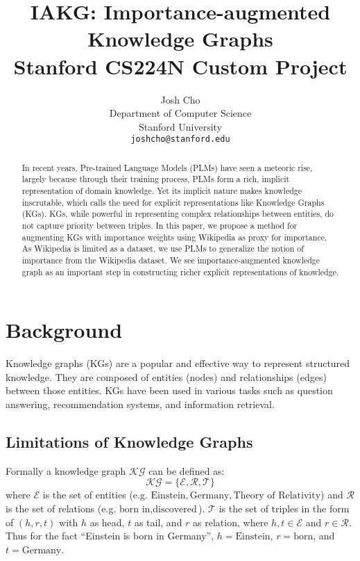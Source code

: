 \documentclass{article}
\title{
  IAKG: Importance-augmented Knowledge Graphs \\
  \vspace{1em}
  \small{\normalfont Stanford CS224N Custom Project}  %
}
\author{
  Josh Cho \\
  Department of Computer Science \\
  Stanford University \\
  \texttt{joshcho@stanford.edu} \\
}
\begin{document}
\maketitle

\begin{abstract}
  In recent years, Pre-trained Language Models (PLMs) have seen a meteoric rise, largely because through their training process, PLMs form a rich, implicit representation of domain knowledge. Yet its implicit nature makes knowledge inscrutable, which calls the need for explicit representations like Knowledge Graphs (KGs). KGs, while powerful in representing complex relationships between entities, do not capture priority between triples. In this paper, we propose a method for augmenting KGs with importance weights using Wikipedia as proxy for importance. As Wikipedia is limited as a dataset, we use PLMs to generalize the notion of importance from the Wikipedia dataset. We see importance-augmented knowledge graph as an important step in constructing richer explicit representations of knowledge.
\end{abstract}

\section{Background}
Knowledge graphs (KGs) are a popular and effective way to represent structured knowledge. They are composed of entities (nodes) and relationships (edges) between those entities. KGs have been used in various tasks such as question answering, recommendation systems, and information retrieval.

\subsection{Limitations of Knowledge Graphs}
Formally a knowledge graph $\mathcal{KG}$ can be defined as:
\begin{equation*}
  \mathcal{KG} = \{\mathcal{E}, \mathcal{R}, \mathcal{T}\}
\end{equation*}
where $\mathcal{E}$ is the set of entities (e.g. $\text{Einstein}, \text{Germany}, \text{Theory of Relativity}$) and $\mathcal{R}$ is the set of relations (e.g. $\text{born in}, \text{discovered}$). $\mathcal{T}$ is the set of triples in the form of $(h,r,t)$ with $h$ as head, $t$ as tail, and $r$ as relation, where $h,t \in \mathcal{E}$ and $r \in \mathcal{R}$. Thus for the fact ``Einstein is born in Germany'', $h = \text{Einstein}$, $r = \text{born}$, and $t = \text{Germany}$.
\end{document}
